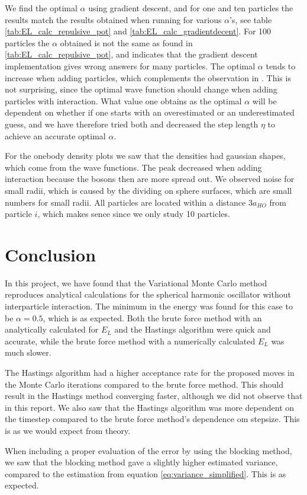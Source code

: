 \documentclass[norsk,a4paper,12pt]{article}
\begin{document}
We find the optimal $\alpha$ using gradient descent, and for one and ten particles the results match the results obtained when running for various $\alpha$'s, see table \ref{tab:EL_calc_repulsive_pot} and \ref{tab:EL_calc_gradientdecent}. For 100 particles the $\alpha$ obtained is not the same as found in \ref{tab:EL_calc_repulsive_pot}, and indicates that the gradient descent implementation gives wrong answers for many particles. The optimal $\alpha$ tends to increase when adding particles, which complements the observation in \cite{Nilsen}. This is not surprising, since the optimal wave function should change when adding particles with interaction. What value one obtains as the optimal $\alpha$ will be dependent on whether if one starts with an overestimated or an underestimated guess, and we have therefore tried both and decreased the step length $\eta$ to achieve an accurate optimal $\alpha$.
\par 
\vspace{3mm}

For the onebody density plots we saw that the densities had gaussian shapes, which come from the wave functions. The peak decreased when adding interaction because the bosons then are more spread out. We observed noise for small radii, which is caused by the dividing on sphere surfaces, which are small numbers for small radii. All particles are located within a distance $3a_{HO}$ from particle $i$, which makes sence since we only study 10 particles. 


\section{Conclusion}

In this project, we have found that the Variational Monte Carlo method reproduces analytical calculations for the spherical harmonic oscillator without interparticle interaction. The minimum in the energy was found for this case to be $\alpha=0.5$, which is as expected. Both the brute force method with an analytically calculated for $E_L$ and the Hastings algorithm were quick and accurate, while the brute force method with a numerically calculated $E_L$ was much slower.

The Hastings algorithm had a higher acceptance rate for the proposed moves in the Monte Carlo iterations compared to the brute force method. This should result in the Hastings method converging faster, although we did not observe that in this report. We also saw that the Hastings algorithm was more dependent on the timestep compared to the brute force method's dependence om stepsize. This is as we would expect from theory.  \par
When including a proper evaluation of the error by using the blocking method, we saw that the blocking method gave a slightly higher estimated variance, compared to the estimation from equation \ref{eq:variance_simplified}. This is as expected.
\end{document}

